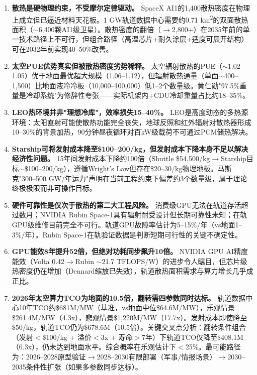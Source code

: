 \begin{enumerate}[leftmargin=*]

    \item \textbf{散热是硬物理约束，不受摩尔定律驱动。}
    SpaceX AI1的1,400\unitWpm{}散热密度在物理上成立但已逼近材料天花板。1 GW轨道数据中心需要约0.71 km\textsuperscript{2}的双面散热面积（$\sim$6,400颗AI1级卫星）。散热密度的翻倍（$\rightarrow$2,800+\unitWpm{}）在2035年前的单一技术路径上不可行，但组合路径（高温芯片+耐久涂层+适度可展开结构）可在2032年前实现40--50\%改善。

    \item \textbf{太空PUE优势真实但被散热密度劣势稀释。}
    太空辐射散热的PUE（$\sim$1.02--1.05）优于地面最优超大规模（1.06--1.12），但辐射散热通量（单面$\sim$400--1,500\unitWpm{}）比地面液冷冷板（10,000--100,000\unitWpm{}）低1--2个数量级。黄仁勋"97.5\%重量是冷却系统"为修辞性夸张——实际机架内+CDU冷却重量占比约18--35\%。

    \item \textbf{LEO热环境并非"理想冷库"，效率损失15--40\%。}
    LEO是高度动态的多热源环境：太阳直射可能使散热功能完全丧失，地球反照和红外辐射对散热器形成10--30\%的背景加热，90分钟昼夜循环对百kW级载荷不可通过PCM储热解决。

    \item \textbf{Starship可将发射成本降至\$100--200/kg，但发射成本下降本身不足以解决经济性问题。}
    15年间发射成本下降约100倍（Shuttle \$54,500/kg$\rightarrow$Starship目标$\sim$\$100--200/kg），遵循Wright's Law但存在\$20--30/kg物理地板。马斯克"300--500 GW/年运力"声明在当前工程约束下偏差约3个数量级，属于理论终极极限而非可操作目标。

    \item \textbf{硬件可靠性是仅次于散热的第二大工程风险。}
    消费级GPU无法在轨道存活超过数月；NVIDIA Rubin Space-1具有辐射耐受设计但长期可靠性未知；在轨GPU级维修目前完全不可行。轨道GPU故障率估计为5--15\%/年（vs地面1--3\%/年）。Rubin Space-1在轨验证数据是判断短期可行性的关键不确定性。

    \item \textbf{GPU能效8年提升52倍，但绝对功耗同步飙升10倍。}
    NVIDIA GPU AI精度能效（Volta 0.42$\rightarrow$Rubin $\sim$21.7 TFLOPS/W）的进步令人瞩目，但芯片级热密度仍在增加（Dennard缩放已失效），轨道散热面积需求与算力增长几乎成正比。

    \item \textbf{2026年太空算力TCO为地面的10.5倍，翻转需四参数同时达标。}
    轨道数据中心10年TCO约\$681M/MW（基准，vs地面中位\$64.6M/MW），乐观情景\$261.4M/MW（4.3x），悲观情景\$1,220M/MW（17.7x）。发射成本即使降至\$50/kg，轨道TCO仍为\$678.6M（10.5倍）。关键交叉点分析：翻转条件组合（发射$<$\$100/kg + 溢价$<$3x + 寿命$>$7年）下轨道TCO仅降至\$408.1M（6.3x），仍未达到地面水平。综合概率在乐观估计下$<$25\%。最可能路径为：2026--2028原型验证$\rightarrow$2028--2030有限部署（军事/情报场景）$\rightarrow$2030--2035条件性扩张（如果多参数同步达标）。

\end{enumerate}

